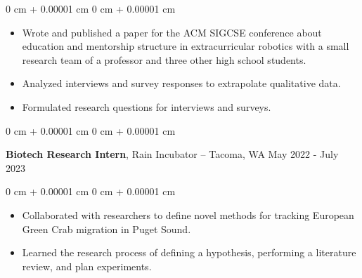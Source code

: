 \documentclass[10pt, article]{article}
\newenvironment{highlights}{
    \begin{itemize}[
        topsep=0.10 cm,
        parsep=0.10 cm,
        partopsep=0pt,
        itemsep=0pt,
        leftmargin=0 cm + 10pt
    ]
}{
    \end{itemize}
} %
\newenvironment{onecolentry}{
    \begin{adjustwidth}{
        0 cm + 0.00001 cm
    }{
        0 cm + 0.00001 cm
    }
}{
    \end{adjustwidth}
} %
\newenvironment{twocolentry}[2][]{
    \onecolentry
    \def\secondColumn{#2}
    \setcolumnwidth{\fill, 4.5 cm}
    \begin{paracol}{2}
}{
    \switchcolumn \raggedleft \secondColumn
    \end{paracol}
    \endonecolentry
} %
\begin{document}
        \vspace{0.20 cm}
        \begin{onecolentry}
            \begin{highlights}
              \item Wrote and published a paper for the ACM SIGCSE conference about education and mentorship structure in extracurricular robotics with a small research team of a professor and three other high school students.
              \item Analyzed interviews and survey responses to extrapolate qualitative data.
              \item Formulated research questions for interviews and surveys.
            \end{highlights}
        \end{onecolentry}
        \vspace{0.2 cm}
        \begin{twocolentry}{ 
            May 2022 - July 2023

          }
        \textbf{Biotech Research Intern}, Rain Incubator -- Tacoma, WA\end{twocolentry}
        \vspace{0.2 cm}
        \begin{onecolentry}
          \begin{highlights}
          \item Collaborated with researchers to define novel methods for tracking European Green Crab migration in Puget Sound.
          \item Learned the research process of defining a hypothesis, performing a literature review, and plan experiments.

          \end{highlights}
        \end{onecolentry}
\end{document}
